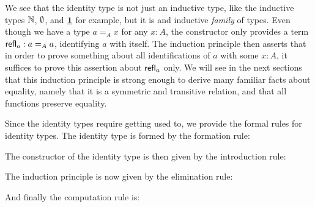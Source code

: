 \begin{rmk}
  We see that the identity type is not just an inductive type, like the inductive types $\N$, $\emptyt$, and $\unit$ for example, but it is and inductive \emph{family} of types. Even though we have a type $a=_A x$ for any $x:A$, the constructor only provides a term $\refl{a}:a=_A a$, identifying $a$ with itself. The induction principle then asserts that in order to prove something about all identifications of $a$ with some $x:A$, it suffices to prove this assertion about $\refl{a}$ only. We will see in the next sections that this induction principle is strong enough to derive many familiar facts about equality, namely that it is a symmetric and transitive relation, and that all functions preserve equality.
\end{rmk}

\begin{rmk}
  Since the identity types require getting used to, we provide the formal rules
  for identity types. The identity type is formed by the formation rule:
  \begin{prooftree}
  \end{prooftree}
  The constructor of the identity type is then given by the introduction rule:
  \begin{prooftree}
  \end{prooftree}
  The induction principle is now given by the elimination rule:
  \begin{prooftree}
  \end{prooftree}
  And finally the computation rule is:
  \begin{prooftree}
  \end{prooftree}
\end{rmk}

